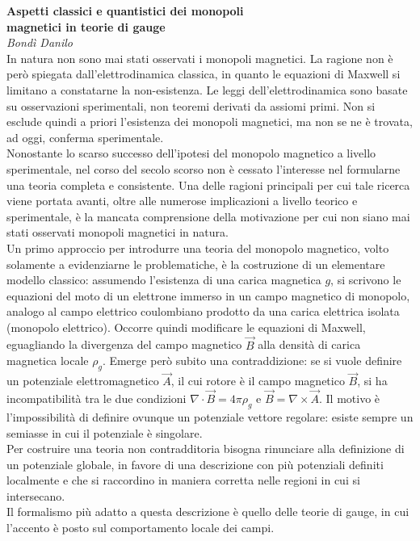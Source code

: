 


{\huge \textbf{Aspetti classici e quantistici dei monopoli \\magnetici in teorie di gauge}}\\
{\Large \emph{Bondì Danilo}}\\


In natura non sono mai stati osservati i monopoli magnetici. La ragione non è però
spiegata dall'elettrodinamica classica, in quanto le equazioni di Maxwell
si limitano a constatarne la non-esistenza. Le leggi dell'elettrodinamica
sono basate su osservazioni sperimentali, non teoremi derivati da assiomi primi.
Non si esclude quindi a priori l'esistenza dei monopoli magnetici, ma non se ne
è trovata, ad oggi, conferma sperimentale. \\
Nonostante lo scarso successo dell'ipotesi del monopolo magnetico a livello sperimentale,
nel corso del secolo scorso non è cessato l'interesse nel formularne una teoria
completa e consistente. Una delle ragioni principali per cui tale ricerca viene
portata avanti, oltre alle numerose implicazioni a livello
teorico e sperimentale, è la mancata comprensione della motivazione
per cui non siano mai stati osservati monopoli magnetici in natura.\\

Un primo approccio per introdurre una teoria del monopolo magnetico, volto solamente
a evidenziarne le problematiche, è la costruzione di un elementare modello classico:
assumendo l'esistenza di una carica magnetica $g$, si scrivono le equazioni del moto
di un elettrone immerso in un campo magnetico di monopolo, analogo al campo elettrico
coulombiano prodotto da una carica elettrica isolata
(monopolo elettrico). Occorre quindi modificare le equazioni di Maxwell,
eguagliando la divergenza del campo magnetico $\vec B$ alla densità di carica magnetica
locale $\rho_g$.
Emerge però subito una contraddizione: se si vuole definire
un potenziale elettromagnetico $\vec A$, il cui rotore è il campo magnetico $\vec B$,
si ha incompatibilità tra le due condizioni $\nabla \cdot \vec B = 4 \pi\rho_g$ e
$\vec B = \nabla \times \vec A$. Il motivo è l'impossibilità di definire ovunque un
potenziale vettore regolare: esiste sempre un semiasse in cui il potenziale è singolare.\\

Per costruire una teoria non contradditoria bisogna rinunciare alla definizione
di un potenziale globale, in favore di una descrizione con più potenziali definiti
localmente e che si raccordino in maniera corretta nelle regioni in cui si intersecano.\\
Il formalismo più adatto a questa descrizione è quello delle teorie di gauge, in
cui l'accento è posto sul comportamento locale dei campi.\\


